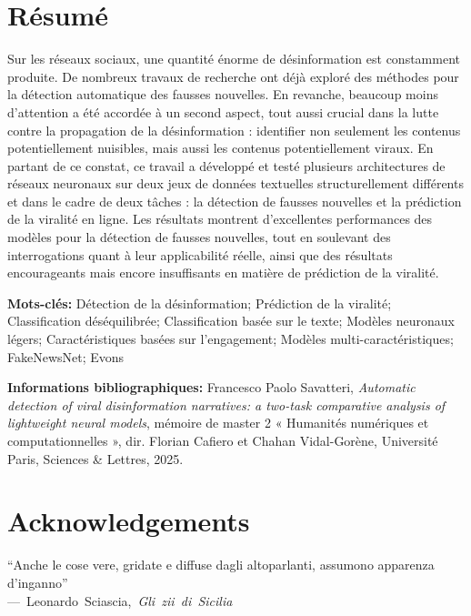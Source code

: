 \documentclass[a4paper,twoside,12pt]{book}
\begin{document}
	\section*{Résumé}
	\vspace{-0.5em}
	Sur les réseaux sociaux, une quantité énorme de désinformation est constamment produite. De nombreux travaux de recherche ont déjà exploré des méthodes pour la détection automatique des fausses nouvelles. En revanche, beaucoup moins d’attention a été accordée à un second aspect, tout aussi crucial dans la lutte contre la propagation de la désinformation : identifier non seulement les contenus potentiellement nuisibles, mais aussi les contenus potentiellement viraux. En partant de ce constat, ce travail a développé et testé plusieurs architectures de réseaux neuronaux sur deux jeux de données textuelles structurellement différents et dans le cadre de deux tâches : la détection de fausses nouvelles et la prédiction de la viralité en ligne. Les résultats montrent d’excellentes performances des modèles pour la détection de fausses nouvelles, tout en soulevant des interrogations quant à leur applicabilité réelle, ainsi que des résultats encourageants mais encore insuffisants en matière de prédiction de la viralité.
	
	\medskip
	
	\textbf{Mots-clés:} Détection de la désinformation; Prédiction de la viralité; Classification déséquilibrée; Classification basée sur le texte; Modèles neuronaux légers; Caractéristiques basées sur l’engagement; Modèles multi-caractéristiques; FakeNewsNet; Evons
	
	\textbf{Informations bibliographiques:} Francesco Paolo Savatteri, \textit{Automatic detection of viral disinformation narratives: a two-task comparative analysis of lightweight neural models}, mémoire de master 2 « Humanités numériques et computationnelles », dir. Florian Cafiero et Chahan Vidal-Gorène, Université Paris, Sciences \& Lettres, 2025.
	
	
	\clearpage
	
	\section*{Acknowledgements}
	
	\vspace{2em}
	
	\begin{flushright}
		\begin{minipage}{0.45\textwidth}
	``Anche le cose vere, gridate e diffuse dagli altoparlanti, assumono apparenza d’inganno''\\
		\mbox{} \hfill \mbox{--- Leonardo Sciascia, \textit{Gli zii di Sicilia}}
		\end{minipage}
	\end{flushright}
	
\end{document}
